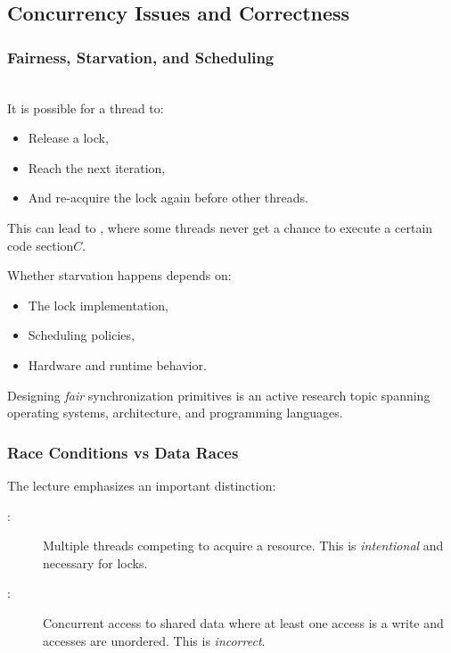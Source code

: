 \subsection{Concurrency Issues and Correctness}

\subsubsection{Fairness, Starvation, and Scheduling}

\begin{pppitfall}
\\ It is possible for a thread to:
\begin{itemize}
    \item Release a lock,
    \item Reach the next iteration,
    \item And re-acquire the lock again before other threads.
\end{itemize}
This can lead to , where some threads never get a chance to execute a certain code section$C$.
\end{pppitfall}

Whether starvation happens depends on:
\begin{itemize}
    \item The lock implementation,
    \item Scheduling policies,
    \item Hardware and runtime behavior.
\end{itemize}

Designing \emph{fair} synchronization primitives is an active research topic spanning operating systems, architecture, and programming languages.

\subsubsection{Race Conditions vs Data Races}

The lecture emphasizes an important distinction:

\begin{ppdefn}
\begin{description}
    \item[:] Multiple threads competing to acquire a resource. This is \emph{intentional} and necessary for locks.
    \item[:] Concurrent access to shared data where at least one access is a write and accesses are unordered. This is \emph{incorrect}.
\end{description}
\end{ppdefn}

